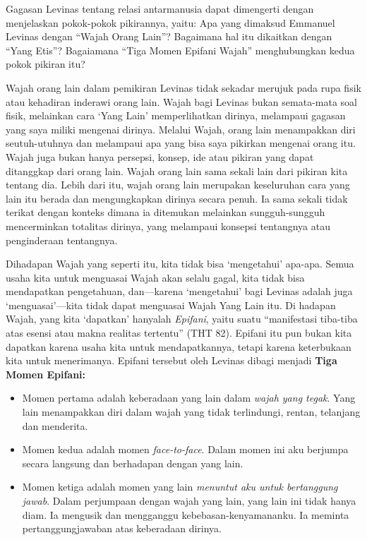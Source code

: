 \documentclass[10pt,a4paper]{article}
\def\tightlist{}
\begin{document}
\begin{multicols}{2}
Gagasan Levinas tentang relasi antarmanusia dapat dimengerti dengan
menjelaskan pokok-pokok pikirannya, yaitu: Apa yang dimaksud Emmanuel
Levinas dengan ``Wajah Orang Lain''? Bagaimana hal itu dikaitkan dengan
``Yang Etis''? Bagaiamana ``Tiga Momen Epifani Wajah'' menghubungkan
kedua pokok pikiran itu?

Wajah orang lain dalam pemikiran Levinas tidak sekadar merujuk pada rupa
fisik atau kehadiran inderawi orang lain. Wajah bagi Levinas bukan
semata-mata soal fisik, melainkan cara `Yang Lain' memperlihatkan
dirinya, melampaui gagasan yang saya miliki mengenai dirinya. Melalui
Wajah, orang lain menampakkan diri seutuh-utuhnya dan melampaui apa yang
bisa saya pikirkan mengenai orang itu. Wajah juga bukan hanya persepsi,
konsep, ide atau pikiran yang dapat ditanggkap dari orang lain. Wajah
orang lain sama sekali lain dari pikiran kita tentang dia. Lebih dari
itu, wajah orang lain merupakan keseluruhan cara yang lain itu berada
dan mengungkapkan dirinya secara penuh. Ia sama sekali tidak terikat
dengan konteks dimana ia ditemukan melainkan sungguh-sungguh
mencerminkan totalitas dirinya, yang melampaui konsepsi tentangnya atau
penginderaan tentangnya.

Dihadapan Wajah yang seperti itu, kita tidak bisa `mengetahui' apa-apa.
Semua usaha kita untuk menguasai Wajah akan selalu gagal, kita tidak
bisa mendapatkan pengetahuan, dan---karena `mengetahui' bagi Levinas
adalah juga `menguasai'---kita tidak dapat menguasai Wajah Yang Lain
itu. Di hadapan Wajah, yang kita `dapatkan' hanyalah \emph{Epifani},
yaitu suatu ``manifestasi tiba-tiba atas esensi atau makna realitas
tertentu'' (THT 82). Epifani itu pun bukan kita dapatkan karena usaha
kita untuk mendapatkannya, tetapi karena keterbukaan kita untuk
menerimanya. Epifani tersebut oleh Levinas dibagi menjadi \textbf{Tiga
Momen Epifani:}

\begin{itemize}
\tightlist
\item
  Momen pertama adalah keberadaan yang lain dalam \emph{wajah yang
  tegak}. Yang lain menampakkan diri dalam wajah yang tidak terlindungi,
  rentan, telanjang dan menderita.
\item
  Momen kedua adalah momen \emph{face-to-face}. Dalam momen ini aku
  berjumpa secara langsung dan berhadapan dengan yang lain.
\item
  Momen ketiga adalah momen yang lain \emph{menuntut aku untuk
  bertanggung jawab}. Dalam perjumpaan dengan wajah yang lain, yang lain
  ini tidak hanya diam. Ia mengusik dan mengganggu
  kebebasan-kenyamananku. Ia meminta pertanggungjawaban atas keberadaan
  dirinya.
\end{itemize}


\end{multicols}
\end{document}
